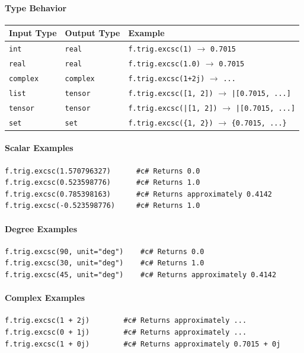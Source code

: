 \paragraph{Type Behavior}
\begin{center}
\begin{tabular}{lll}
\textbf{Input Type} & \textbf{Output Type} & \textbf{Example} \\ \hline
\texttt{int} & \texttt{real} & \texttt{f.trig.excsc(1)} $\to$ \texttt{0.7015} \\
\texttt{real} & \texttt{real} & \texttt{f.trig.excsc(1.0)} $\to$ \texttt{0.7015} \\
\texttt{complex} & \texttt{complex} & \texttt{f.trig.excsc(1+2j)} $\to$ \texttt{...} \\
\texttt{list} & \texttt{tensor} & \texttt{f.trig.excsc([1, 2])} $\to$ \texttt{|[0.7015, ...]} \\
\texttt{tensor} & \texttt{tensor} & \texttt{f.trig.excsc(|[1, 2])} $\to$ \texttt{|[0.7015, ...]} \\
\texttt{set} & \texttt{set} & \texttt{f.trig.excsc(\{1, 2\})} $\to$ \texttt{\{0.7015, ...\}} \\
\end{tabular}
\end{center}

\paragraph{Scalar Examples}
\begin{verbatim}
f.trig.excsc(1.570796327)      #c# Returns 0.0
f.trig.excsc(0.523598776)      #c# Returns 1.0
f.trig.excsc(0.785398163)      #c# Returns approximately 0.4142
f.trig.excsc(-0.523598776)     #c# Returns 1.0
\end{verbatim}

\paragraph{Degree Examples}
\begin{verbatim}
f.trig.excsc(90, unit="deg")    #c# Returns 0.0
f.trig.excsc(30, unit="deg")    #c# Returns 1.0
f.trig.excsc(45, unit="deg")    #c# Returns approximately 0.4142
\end{verbatim}

\paragraph{Complex Examples}
\begin{verbatim}
f.trig.excsc(1 + 2j)        #c# Returns approximately ...
f.trig.excsc(0 + 1j)        #c# Returns approximately ...
f.trig.excsc(1 + 0j)        #c# Returns approximately 0.7015 + 0j
\end{verbatim}

